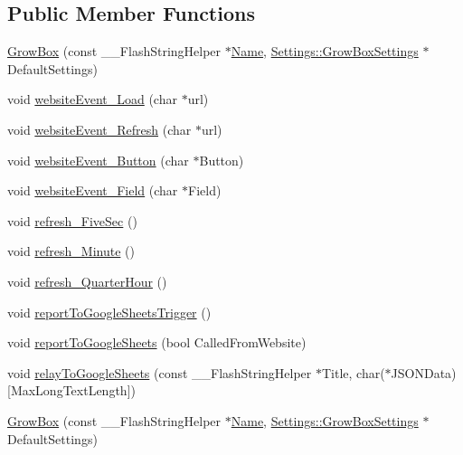 \subsection*{Public Member Functions}
\begin{DoxyCompactItemize}
\item 
\hyperlink{class_grow_box_a56729a0c282ec48e356c99d1c66b2266}{Grow\+Box} (const \+\_\+\+\_\+\+Flash\+String\+Helper $\ast$\hyperlink{class_common_aeea91a726dbe988e515057b32ba0726f}{Name}, \hyperlink{struct_settings_1_1_grow_box_settings}{Settings\+::\+Grow\+Box\+Settings} $\ast$Default\+Settings)
\item 
void \hyperlink{class_grow_box_a486cdc90cf59c3059c96b3f021eec5d5}{website\+Event\+\_\+\+Load} (char $\ast$url)
\item 
void \hyperlink{class_grow_box_aa75f2898bbac66ab08cb257e4285f51e}{website\+Event\+\_\+\+Refresh} (char $\ast$url)
\item 
void \hyperlink{class_grow_box_ad246a22690da3301345b0337aab8258f}{website\+Event\+\_\+\+Button} (char $\ast$Button)
\item 
void \hyperlink{class_grow_box_a5c5ba0de9289075db990a15a5c0b7634}{website\+Event\+\_\+\+Field} (char $\ast$Field)
\item 
void \hyperlink{class_grow_box_ad3c74a1bbf508489f113215d1f4ae43f}{refresh\+\_\+\+Five\+Sec} ()
\item 
void \hyperlink{class_grow_box_a8763d725baee8237bc63865d464375d8}{refresh\+\_\+\+Minute} ()
\item 
void \hyperlink{class_grow_box_ac542032f42c8d6eac941ba4d98b73447}{refresh\+\_\+\+Quarter\+Hour} ()
\item 
void \hyperlink{class_grow_box_a45f0e8f17bae077486e5839d621cdf5b}{report\+To\+Google\+Sheets\+Trigger} ()
\item 
void \hyperlink{class_grow_box_a8070acc30dff79b90ff5d813fab1921f}{report\+To\+Google\+Sheets} (bool Called\+From\+Website)
\item 
void \hyperlink{class_grow_box_aac4b1240925ce9791d1a1c804839d345}{relay\+To\+Google\+Sheets} (const \+\_\+\+\_\+\+Flash\+String\+Helper $\ast$Title, char($\ast$J\+S\+O\+N\+Data)\mbox{[}Max\+Long\+Text\+Length\mbox{]})
\item 
\hyperlink{class_grow_box_a56729a0c282ec48e356c99d1c66b2266}{Grow\+Box} (const \+\_\+\+\_\+\+Flash\+String\+Helper $\ast$\hyperlink{class_common_aeea91a726dbe988e515057b32ba0726f}{Name}, \hyperlink{struct_settings_1_1_grow_box_settings}{Settings\+::\+Grow\+Box\+Settings} $\ast$Default\+Settings)

\end{DoxyCompactItemize}

